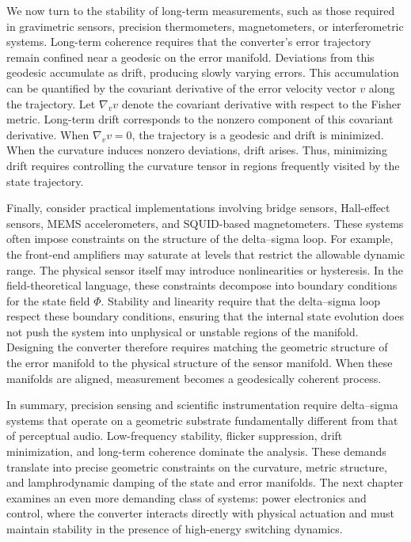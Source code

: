 We now turn to the stability of long-term measurements, such as those required in gravimetric sensors, precision thermometers, magnetometers, or interferometric systems. Long-term coherence requires that the converter's error trajectory remain confined near a geodesic on the error manifold. Deviations from this geodesic accumulate as drift, producing slowly varying errors. This accumulation can be quantified by the covariant derivative of the error velocity vector \(v\) along the trajectory. Let \( \nabla_{v} v \) denote the covariant derivative with respect to the Fisher metric. Long-term drift corresponds to the nonzero component of this covariant derivative. When \(\nabla_{v} v = 0\), the trajectory is a geodesic and drift is minimized. When the curvature induces nonzero deviations, drift arises. Thus, minimizing drift requires controlling the curvature tensor in regions frequently visited by the state trajectory.

Finally, consider practical implementations involving bridge sensors, Hall-effect sensors, MEMS accelerometers, and SQUID-based magnetometers. These systems often impose constraints on the structure of the delta–sigma loop. For example, the front-end amplifiers may saturate at levels that restrict the allowable dynamic range. The physical sensor itself may introduce nonlinearities or hysteresis. In the field-theoretical language, these constraints decompose into boundary conditions for the state field \( \Phi \). Stability and linearity require that the delta–sigma loop respect these boundary conditions, ensuring that the internal state evolution does not push the system into unphysical or unstable regions of the manifold. Designing the converter therefore requires matching the geometric structure of the error manifold to the physical structure of the sensor manifold. When these manifolds are aligned, measurement becomes a geodesically coherent process.

In summary, precision sensing and scientific instrumentation require delta–sigma systems that operate on a geometric substrate fundamentally different from that of perceptual audio. Low-frequency stability, flicker suppression, drift minimization, and long-term coherence dominate the analysis. These demands translate into precise geometric constraints on the curvature, metric structure, and lamphrodynamic damping of the state and error manifolds. The next chapter examines an even more demanding class of systems: power electronics and control, where the converter interacts directly with physical actuation and must maintain stability in the presence of high-energy switching dynamics.



